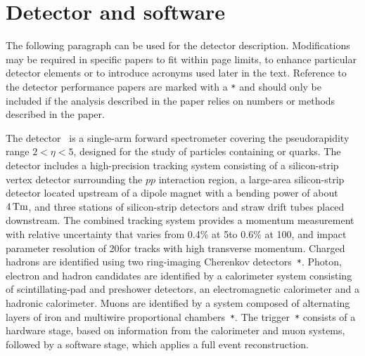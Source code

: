 \section{Detector and software}
\label{sec:Detector}
The following paragraph can be used for the detector
description. Modifications may be required in specific papers to fit
within page limits, to enhance particular detector elements or to
introduce acronyms used later in the text.
Reference to the detector performance papers are marked with a \verb!*!
and should only be included if the analysis described in the paper
relies on numbers or methods described in the paper.

The \lhcb detector~\cite{Alves:2008zz} is a single-arm forward
spectrometer covering the \mbox{pseudorapidity} range $2<\eta <5$,
designed for the study of particles containing \bquark or \cquark
quarks. The detector includes a high-precision tracking system
consisting of a silicon-strip vertex detector surrounding the $pp$
interaction region, a large-area silicon-strip detector located
upstream of a dipole magnet with a bending power of about
$4{\rm\,Tm}$, and three stations of silicon-strip detectors and straw
drift tubes placed downstream.
The combined tracking system provides a momentum measurement with
relative uncertainty that varies from 0.4\% at 5\gevc to 0.6\% at 100\gevc,
and impact parameter resolution of 20\mum for
tracks with high transverse momentum. Charged hadrons are identified
using two ring-imaging Cherenkov detectors~\cite{LHCb-DP-2012-003}\verb!*!. Photon, electron and
hadron candidates are identified by a calorimeter system consisting of
scintillating-pad and preshower detectors, an electromagnetic
calorimeter and a hadronic calorimeter. Muons are identified by a
system composed of alternating layers of iron and multiwire
proportional chambers~\cite{LHCb-DP-2012-002}\verb!*!.
The trigger~\cite{LHCb-DP-2012-004}\verb!*! consists of a
hardware stage, based on information from the calorimeter and muon
systems, followed by a software stage, which applies a full event
reconstruction.

